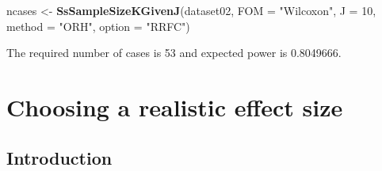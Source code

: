 \documentclass[
]{book}
\newenvironment{Shaded}{\begin{snugshade}}{\end{snugshade}}
\newcommand{\DataTypeTok}[1]{\textcolor[rgb]{0.13,0.29,0.53}{#1}}
\newcommand{\DecValTok}[1]{\textcolor[rgb]{0.00,0.00,0.81}{#1}}
\newcommand{\KeywordTok}[1]{\textcolor[rgb]{0.13,0.29,0.53}{\textbf{#1}}}
\newcommand{\NormalTok}[1]{#1}
\newcommand{\StringTok}[1]{\textcolor[rgb]{0.31,0.60,0.02}{#1}}
\begin{document}
\begin{Shaded}
\begin{Highlighting}[]
\NormalTok{ncases \textless{}{-}}\StringTok{ }\KeywordTok{SsSampleSizeKGivenJ}\NormalTok{(dataset02, }\DataTypeTok{FOM =} \StringTok{"Wilcoxon"}\NormalTok{, }\DataTypeTok{J =} \DecValTok{10}\NormalTok{, }\DataTypeTok{method =} \StringTok{"ORH"}\NormalTok{, }\DataTypeTok{option =} \StringTok{"RRFC"}\NormalTok{)}
\end{Highlighting}
\end{Shaded}

The required number of cases is 53 and expected power is 0.8049666.

\hypertarget{SSJafrocEffectSize}{%
\chapter{Choosing a realistic effect size}\label{SSJafrocEffectSize}}

\hypertarget{introduction-11}{%
\section{Introduction}\label{introduction-11}}
\end{document}

